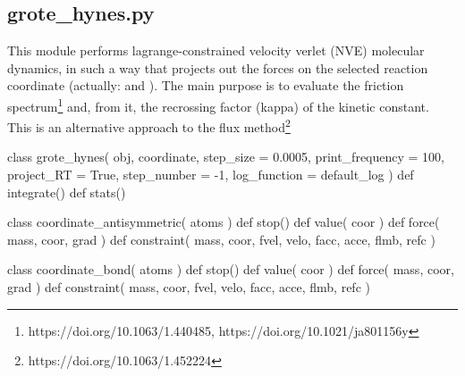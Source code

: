 \normalsize
\subsection[grote\_hynes]{grote\_hynes.py}
This module performs lagrange-constrained velocity verlet (NVE) molecular dynamics, in such a way that projects out the forces
on the selected reaction coordinate (actually:  and ). The main purpose
is to evaluate the friction spectrum\footnote{https://doi.org/10.1063/1.440485, https://doi.org/10.1021/ja801156y} and, 
from it, the recrossing factor (kappa) of the kinetic constant.\\
This is an alternative approach to the flux method\footnote{https://doi.org/10.1063/1.452224}
\begin{pyglist}[language=python,fvset={frame=single}]
class grote_hynes( obj, coordinate, step_size = 0.0005, print_frequency = 100,
         project_RT = True, step_number = -1, log_function = default_log )
	def integrate()
	def stats()

class coordinate_antisymmetric( atoms )
	def stop()
	def value( coor )
	def force( mass, coor, grad )
	def constraint( mass, coor, fvel, velo, facc, acce, flmb, refc )

class coordinate_bond( atoms )
	def stop()
	def value( coor )
	def force( mass, coor, grad )
	def constraint( mass, coor, fvel, velo, facc, acce, flmb, refc )
\end{pyglist}

\footnotesize
\begin{pyglist}[language=python,fvset={frame=single}]
\end{pyglist}
